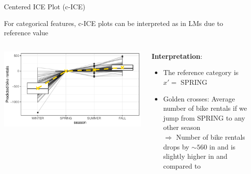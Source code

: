 \documentclass[11pt,compress,t,notes=noshow, aspectratio=169, xcolor=table]{beamer}
\begin{document}
\begin{frame}{Centered ICE Plot (c-ICE)}

For categorical features, c-ICE plots can be interpreted as in LMs due to reference value

\begin{columns}[c]
\begin{column}{0.44\textwidth}

\begin{center}
\includegraphics[width=\textwidth]{figure/cICEcat}
\end{center}

\end{column}
\begin{column}{0.55\textwidth}

\textbf{Interpretation}: \\
\begin{itemize}
\item The reference category is $x' =$ SPRING
\item Golden crosses: Average number of bike rentals if we jump from SPRING to any other season\\
$\Rightarrow$ Number of bike rentals drops by $\sim 560$ in  and is slightly higher in  and  compared to 
\end{itemize}

\end{column}
\end{columns}

\end{frame}


\endlecture
\end{document}
